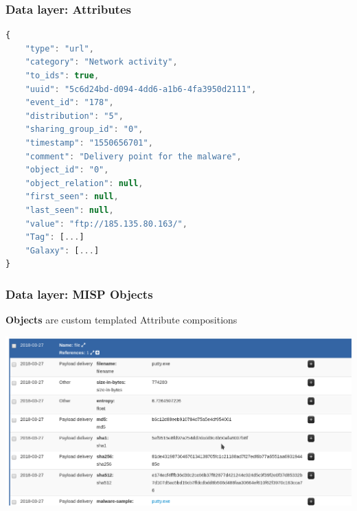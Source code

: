 \begin{frame}[fragile]
    \frametitle{Data layer: Attributes}
        \begin{lstlisting}[language=javascript,firstnumber=1]
{
    "type": "url",
    "category": "Network activity",
    "to_ids": true,
    "uuid": "5c6d24bd-d094-4dd6-a1b6-4fa3950d2111",
    "event_id": "178",
    "distribution": "5",
    "sharing_group_id": "0",
    "timestamp": "1550656701",
    "comment": "Delivery point for the malware",
    "object_id": "0",
    "object_relation": null,
    "first_seen": null,
    "last_seen": null,
    "value": "ftp://185.135.80.163/",
    "Tag": [...]
    "Galaxy": [...]
}
\end{lstlisting}
\end{frame}

\begin{frame}
    \frametitle{Data layer: MISP Objects}
        {\bf Objects} are custom templated Attribute compositions
        \begin{center}
            \includegraphics[width=1.0\linewidth]{object.png}
        \end{center}
\end{frame}

